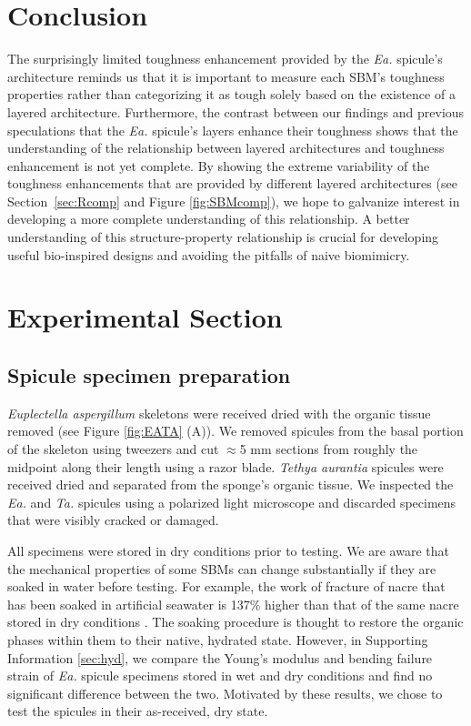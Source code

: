 \documentclass[12pt,onecolumn]{article}
\makeatletter
\newcommand{\TA}{\textit{Ta.\@}\xspace}
\newcommand{\EA}{\textit{Ea.\@}\xspace}
\makeatother
\begin{document}
\begin{bibunit}
\section{Conclusion}
The surprisingly limited toughness enhancement provided by the \EA spicule's architecture reminds us that it is important to measure each SBM's toughness properties rather than categorizing it as tough solely based on the existence of a layered architecture. Furthermore, the contrast between our findings and previous speculations that the \EA spicule's layers enhance their toughness shows that the understanding of the relationship between layered architectures and toughness enhancement is not yet complete. By showing the extreme variability of the toughness enhancements that are provided by different layered architectures (see Section~\ref{sec:Rcomp} and Figure \ref{fig:SBMcomp}), we hope to galvanize interest in developing a more complete understanding of this relationship. A better understanding of this structure-property relationship is crucial for developing useful bio-inspired designs and avoiding the pitfalls of naive biomimicry.

\section{Experimental Section}
\label{sec:methods}

\subsection{Spicule specimen preparation}
\label{sec:sampleprep}
\textit{Euplectella aspergillum} skeletons were received dried with the organic tissue removed (see Figure \ref{fig:EATA} (A)). We removed spicules from the basal portion of the skeleton using tweezers and cut $\approx$5 mm sections from roughly the midpoint along their length using a razor blade. \textit{Tethya aurantia} spicules were received dried and separated from the sponge's organic tissue. We inspected the \EA and \TA spicules using a polarized light microscope and discarded specimens that were visibly cracked or damaged.

All specimens were stored in dry conditions prior to testing. We are aware that the mechanical properties of some SBMs can change substantially if they are soaked in water before testing. For example, the work of fracture of nacre that has been soaked in artificial seawater is 137\% higher than that of the same nacre stored in dry conditions \cite{jackson1988}. The soaking procedure is thought to restore the organic phases within them to their native, hydrated state.  However, in Supporting Information \ref{sec:hyd}, we compare the Young's modulus and bending failure strain of \EA spicule specimens stored in wet and dry conditions and find no significant difference between the two. Motivated by these results, we chose to test the spicules in their as-received, dry state.


\end{bibunit}
\end{document}
